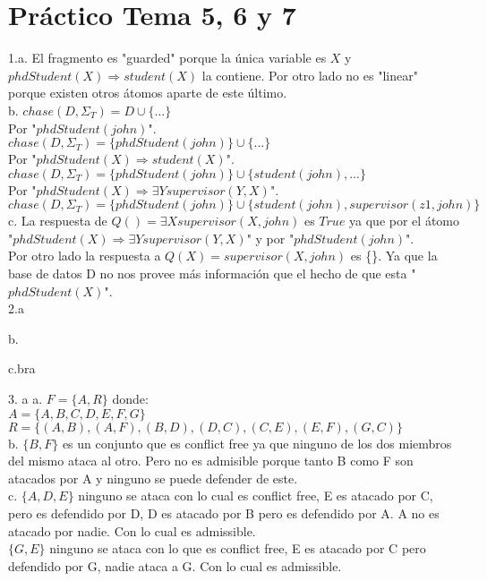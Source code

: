 \chapter{Práctico Tema 5, 6 y 7}

1.a. El fragmento es "guarded" porque la única variable es $X$ y $phdStudent(X) \Longrightarrow student(X)$ la contiene. Por otro lado no es "linear" porque existen otros átomos aparte de este último. \\

b. $chase(D, \Sigma_{T}) = D \cup \{...\}$ \\

Por "$phdStudent(john)$".\\

$chase(D, \Sigma_{T}) = \{phdStudent(john)\} \cup \{ ... \}$ \\

Por "$phdStudent(X) \Longrightarrow student(X)$". \\

$chase(D, \Sigma_{T}) = \{phdStudent(john)\} \cup \{student(john), ...\}$\\

Por "$phdStudent(X) \Longrightarrow \exists Y supervisor(Y, X)$". \\

$chase(D, \Sigma_{T}) = \{phdStudent(john)\} \cup \{student(john), supervisor(z1, john) \}$ \\

c. La respuesta de $Q() = \exists X supervisor(X, john)$ es $True$ ya que por el átomo "$phdStudent(X) \Longrightarrow \exists Y supervisor(Y, X)$" y por "$phdStudent(john)$". \\

Por otro lado la respuesta a $Q(X) = supervisor(X, john)$ es \{\}. Ya que la base de datos D no nos provee más información que el hecho de que 
esta "$phdStudent(X)$". \\

2.a

b.

c.bra

3. a
a. $F=\{A, R\}$ donde: \\
$A=\{A, B, C, D, E, F, G\}$ \\
$R=\{(A, B), (A, F), (B, D), (D, C), (C, E), (E, F), (G, C)\}$ \\

b. $\{B, F\}$ es un conjunto que es conflict free ya que ninguno de los dos miembros del mismo ataca al otro. Pero no es admisible porque tanto B como F son atacados por A y ninguno se puede defender de este.\\

c. $\{A, D, E\}$ ninguno se ataca con lo cual es conflict free, E es atacado por C, pero es defendido por D, D es atacado por B pero es defendido por A. A no es atacado por nadie. Con lo cual es admissible. \\

$\{G, E\}$ ninguno se ataca con lo que es conflict free, E es atacado por C pero defendido por G, nadie ataca a G. Con lo cual es admissible.

\bigskip